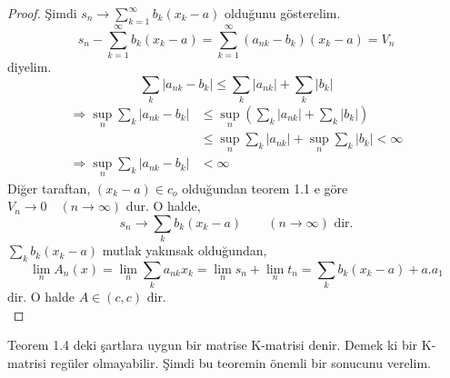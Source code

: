 \begin{proof}
Şimdi $s_n\to\sum\limits_{k=1}^\infty b_k(x_k-a)$ olduğunu gösterelim.
$$
s_n-\sum\limits_{k=1}^\infty b_k(x_k-a)=\sum\limits_{k=1}^\infty(a_{nk}-b_k)(x_k-a)=V_n
$$
diyelim.
$$
\sum_k|a_{nk}-b_k|\leq\sum_k|a_{nk}|+\sum_k|b_k|
$$
$$\begin{aligned}
\Rightarrow\sup_n\sum_k|a_{nk}-b_k|&\leq\sup_n\left(\sum_k|a_{nk}|+\sum_k|b_k|\right)\\
&\leq\sup_n\sum_k|a_{nk}|+\sup_n\sum_k|b_k|<\infty\\
\Rightarrow\sup_n\sum_k|a_{nk}-b_k|&<\infty
\end{aligned}$$
Diğer taraftan, $(x_k-a)\in c_o$ olduğundan teorem 1.1 e göre $V_n\to 0\quad(n\to\infty)$ dur. O halde,
$$
s_n\to\sum_kb_k(x_k-a)\qquad(n\to\infty)\text{ dir.}
$$
$\sum\limits_kb_k(x_k-a)$ mutlak yakınsak olduğundan,
$$
\lim_nA_n(x)=\lim_n\sum_ka_{nk}x_k=\lim_ns_n+\lim_nt_n=\sum_kb_k(x_k-a)+a.a_1
$$
dir. O halde $A\in (c,c)$ dir.\\[5pt]
\end{proof}
Teorem 1.4 deki şartlara uygun bir matrise K-matrisi denir. Demek ki bir K-matrisi regüler olmayabilir. Şimdi bu teoremin önemli bir sonucunu verelim.
\

